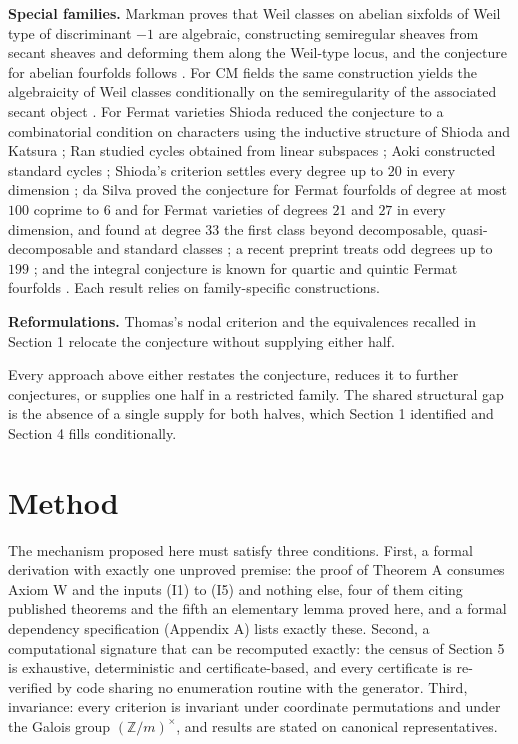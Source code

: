 \documentclass[10pt,twocolumn]{article}
\begin{document}
\textbf{Special families.} Markman proves that Weil classes on abelian
sixfolds of Weil type of discriminant \(-1\) are algebraic, constructing
semiregular sheaves from secant sheaves and deforming them along the
Weil-type locus, and the conjecture for abelian fourfolds follows
\cite{markman2025}. For CM fields the same construction yields the
algebraicity of Weil classes conditionally on the semiregularity of the
associated secant object \cite{markman2025b}. For Fermat varieties
Shioda reduced the conjecture to a combinatorial condition on characters
\cite{shioda1979} using the inductive structure of Shioda and Katsura
\cite{sk1979}; Ran studied cycles obtained from linear subspaces
\cite{ran1980}; Aoki constructed standard cycles \cite{aoki1987};
Shioda's criterion settles every degree up to \(20\) in every dimension
\cite{shioda1979,dasilva2021}; da Silva proved the conjecture for Fermat
fourfolds of degree at most \(100\) coprime to \(6\) and for Fermat
varieties of degrees \(21\) and \(27\) in every dimension, and found at
degree \(33\) the first class beyond decomposable, quasi-decomposable
and standard classes \cite{dasilva2021,dasilva2021survey}; a recent
preprint treats odd degrees up to \(199\) \cite{jumagulov2026}; and the
integral conjecture is known for quartic and quintic Fermat fourfolds
\cite{amv2019}. Each result relies on family-specific constructions.

\textbf{Reformulations.} Thomas's nodal criterion \cite{thomas2005} and
the equivalences recalled in Section 1 relocate the conjecture without
supplying either half.

Every approach above either restates the conjecture, reduces it to
further conjectures, or supplies one half in a restricted family. The
shared structural gap is the absence of a single supply for both halves,
which Section 1 identified and Section 4 fills conditionally.

\hypertarget{method}{%
\section{Method}\label{method}}

The mechanism proposed here must satisfy three conditions. First, a
formal derivation with exactly one unproved premise: the proof of
Theorem A consumes Axiom W and the inputs (I1) to (I5) and nothing else,
four of them citing published theorems and the fifth an elementary lemma
proved here, and a formal dependency specification (Appendix A) lists
exactly these. Second, a computational signature that can be recomputed
exactly: the census of Section 5 is exhaustive, deterministic and
certificate-based, and every certificate is re-verified by code sharing
no enumeration routine with the generator. Third, invariance: every
criterion is invariant under coordinate permutations and under the
Galois group \((\mathbb{Z}/m)^\times\), and results are stated on
canonical representatives.
\end{document}
